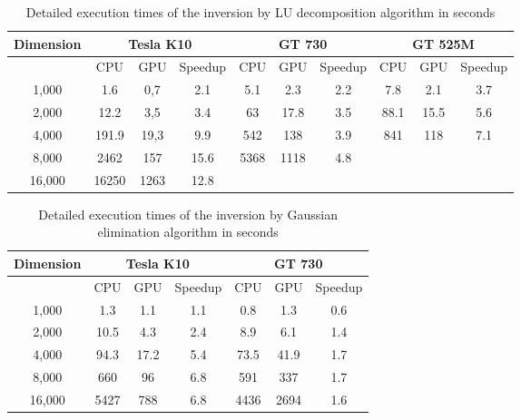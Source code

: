 \begin{table}
	\begin{tabular}{|c|c|c|c|c|c|c|c|c|c|}\hline
		\rowcolor{black!20} \textbf{Dimension} & \multicolumn{3}{c}{ \textbf{Tesla K10}} & \multicolumn{3}{c}{ \textbf{GT 730}} & \multicolumn{3}{c}{ \textbf{GT 525M}} \\\hline
			\rowcolor{black!20} & CPU & GPU & Speedup & CPU & GPU & Speedup & CPU & GPU & Speedup \\\hline\hline
		1,000 & 1.6 & 0,7 & 2.1 & 5.1 & 2.3 & 2.2 & 7.8 & 2.1 & 3.7 \\\hline
		2,000 & 12.2 & 3,5 & 3.4 & 63 & 17.8 & 3.5 & 88.1 & 15.5 & 5.6 \\\hline
		4,000 & 191.9 & 19,3 & 9.9 & 542 & 138 & 3.9 & 841 & 118 & 7.1 \\\hline
		8,000 & 2462 & 157 & 15.6 & 5368 & 1118 & 4.8 & & & \\\hline
		16,000 & 16250 & 1263 & 12.8 &  & & & & & \\\hline
	\end{tabular}
	\centering
	\label{tab:results1}
	\caption{Detailed execution times of the inversion by LU decomposition algorithm in seconds}
\end{table}
\begin{table}
	\begin{tabular}{|c|c|c|c|c|c|c|}\hline
		\rowcolor{black!20} \textbf{Dimension} & \multicolumn{3}{c}{ \textbf{Tesla K10}} & \multicolumn{3}{c}{ \textbf{GT 730}}  \\\hline
		\rowcolor{black!20} & CPU & GPU & Speedup & CPU & GPU & Speedup \\\hline\hline
		1,000 & 1.3 & 1.1 & 1.1 & 0.8 & 1.3 & 0.6 \\\hline
		2,000 & 10.5 & 4.3 & 2.4 & 8.9 & 6.1 & 1.4 \\\hline
		4,000 & 94.3 & 17.2 & 5.4 & 73.5 & 41.9 & 1.7  \\\hline
		8,000 & 660 & 96 & 6.8 & 591 & 337 &  1.7 \\\hline
		16,000 & 5427 & 788  & 6.8  & 4436 & 2694 & 1.6 \\\hline
	\end{tabular}
	\centering
	\label{tab:results2}
	\caption{Detailed execution times of the inversion by Gaussian elimination algorithm in seconds}
\end{table}

